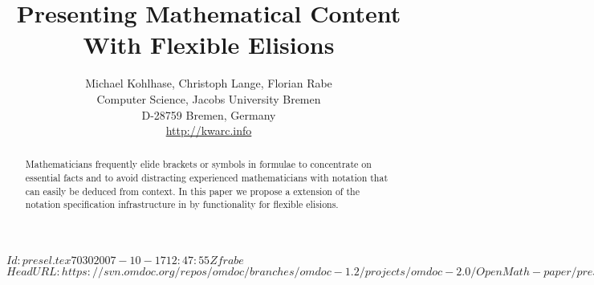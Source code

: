 \documentclass[pdftex,bibtotocnumbered,idxtotoc,twoside]{scrartcl}
\title{Presenting Mathematical Content With Flexible Elisions}
\author{Michael Kohlhase, Christoph Lange, Florian Rabe\\ 
  Computer Science, Jacobs University Bremen\\
  D-28759 Bremen, Germany \\ 
  \url{http://kwarc.info}}
\begin{document}
\svnInfo $Id: presel.tex 7030 2007-10-17 12:47:55Z frabe $
\svnKeyword $HeadURL:https://svn.omdoc.org/repos/omdoc/branches/omdoc-1.2/projects/omdoc-2.0/OpenMath-paper/presel.tex
$
\maketitle
\begin{abstract}
  Mathematicians frequently elide brackets or symbols in formulae to concentrate on
  essential facts and to avoid distracting experienced mathematicians with notation that
  can easily be deduced from context. In this paper we propose a extension of the notation
  specification infrastructure in {\omdoc} by functionality for flexible elisions.
\end{abstract}
\tableofcontents







 


\end{document}
